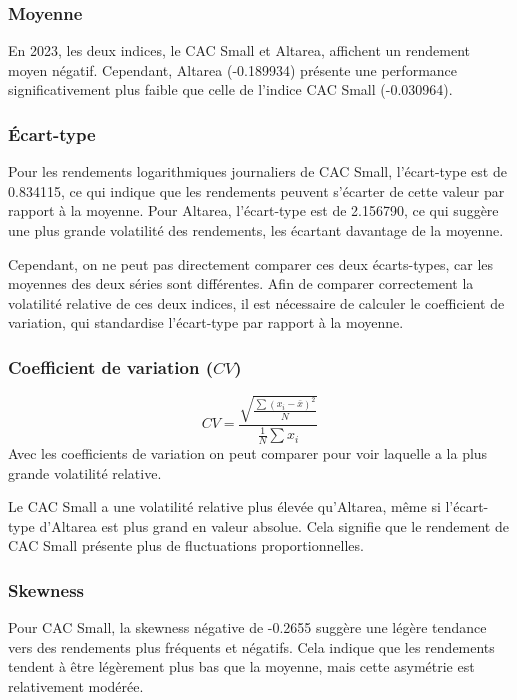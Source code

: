 \documentclass[a4paper, 12pt]{report}
\begin{document}
\subsubsection{Moyenne}
\noindent
En 2023, les deux indices, le CAC Small et Altarea, affichent un rendement moyen négatif. Cependant, Altarea (-0.189934) présente une performance significativement plus faible que celle de l'indice CAC Small (-0.030964).

\subsubsection{Écart-type}

Pour les rendements logarithmiques journaliers de CAC Small, l'écart-type est de 0.834115, ce qui indique que les rendements peuvent s'écarter de cette valeur par rapport à la moyenne.
Pour Altarea, l'écart-type est de 2.156790, ce qui suggère une plus grande volatilité des rendements, les écartant davantage de la moyenne.

Cependant, on ne peut pas directement comparer ces deux écarts-types, car les moyennes des deux séries sont différentes. Afin de comparer correctement la volatilité relative de ces deux indices, il est nécessaire de calculer le coefficient de variation, qui standardise l'écart-type par rapport à la moyenne.

\subsubsection{Coefficient de variation (\( CV \)) }

\[ CV=\frac{\sqrt{\frac{\sum(x_i-\bar{x})^2}{N}}}{\frac{1}{N}\sum x_i}
 \]
Avec les coefficients de variation on peut comparer pour voir laquelle a la plus grande volatilité relative.

Le CAC Small a une volatilité relative plus élevée qu'Altarea, même si l'écart-type d'Altarea est plus grand en valeur absolue. Cela signifie que le rendement de CAC Small présente plus de fluctuations proportionnelles.

\subsubsection{Skewness}
\noindent
Pour CAC Small, la skewness négative de -0.2655 suggère une légère tendance vers des rendements plus fréquents et négatifs. Cela indique que les rendements tendent à être légèrement plus bas que la moyenne, mais cette asymétrie est relativement modérée.
\end{document}

